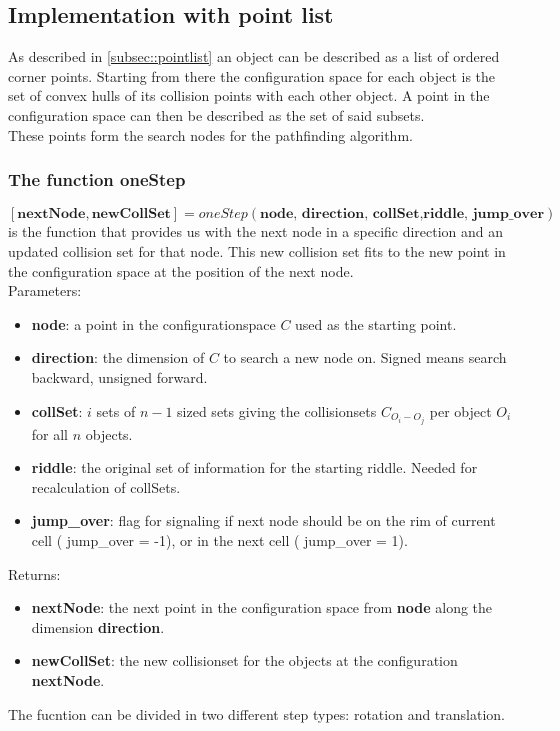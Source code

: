 \subsection{Implementation with point list}
As described in \ref{subsec::pointlist} an object can be described as a list of ordered corner points. Starting from there the configuration space for each object is the set of convex hulls of its collision points with each other object. A point in the configuration space can then be described as the set of said subsets.\\
These points form the search nodes for the pathfinding algorithm.
\subsubsection{The function oneStep}
$[\textbf{nextNode}, \textbf{newCollSet} ]=oneStep(\textbf{node, direction, collSet,riddle, jump\_over})$ is the function that provides us with the next node in a specific direction and an updated collision set for that node. This new collision set fits to the new point in the configuration space at the position of the next node.\\
Parameters:
\begin{itemize}
\item \textbf{node}: a point in the configurationspace $C$ used as the starting point.
\item \textbf{direction}: the dimension of $C$ to search a new node on. Signed means search backward, unsigned forward. 
\item \textbf{collSet}: $i$ sets of $n-1$ sized sets giving the collisionsets $C_{O_i-O_j}$ per object $O_i$ for all $n$ objects.
\item \textbf{riddle}: the original set of information for the starting riddle. Needed for recalculation of collSets.
\item \textbf{jump\_over}: flag for signaling if next node should be on the rim of current cell ( jump\_over = -1), or in the next cell ( jump\_over = 1).
\end{itemize}
Returns:
\begin{itemize}
\item \textbf{nextNode}: the next point in the configuration space from \textbf{node} along the dimension \textbf{direction}.
\item \textbf{newCollSet}: the new collisionset for the objects at the configuration \textbf{nextNode}.
\end{itemize}
The fucntion can be divided in two different step types: rotation and translation. \\
